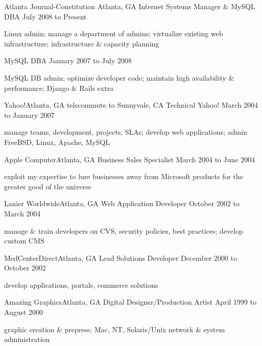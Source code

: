 \documentclass[10pt]{article}
\begin{document}


\sectionheader
{Atlanta Journal-Constitution}
{Atlanta, GA}
{Internet Systems Manager \& MySQL DBA}
{July 2008 to Present}
\begin{longtext}
Linux admin;
manage a department of admins;
virtualize existing web infrastructure;
infrastructure \& capacity planning
\end{longtext}
\sectionsub
{MySQL DBA}
{January 2007 to July 2008}
\begin{longtext}
MySQL DB admin;
optimize developer code;
maintain high availability \& performance;
Django \& Rails extra
\end{longtext}

\sectionheader
{Yahoo!}{Atlanta, GA telecommute to Sunnyvale, CA}
{Technical Yahoo!}
{March 2004 to January 2007}
\begin{longtext}
manage teams, development, projects, SLAs;
develop web applications;
admin FreeBSD, Linux, Apache, MySQL
\end{longtext}

\sectionheader
{Apple Computer}{Atlanta, GA}
{Business Sales Specialist}
{March 2004 to June 2004}
\begin{longtext}
exploit my expertise to lure businesses away from Microsoft products for the greater good of the universe
\end{longtext}

\sectionheader
{Lanier Worldwide}{Atlanta, GA}
{Web Application Developer}
{October 2002 to March 2004}
\begin{longtext}
manage \& train developers on CVS, security policies, best practices;
develop custom CMS
\end{longtext}

\sectionheader
{MedCenterDirect}{Atlanta, GA}
{Lead Solutions Developer}
{December 2000 to October 2002}
\begin{longtext}
develop applications, portals, commerce solutions
\end{longtext}

\sectionheader
{Amazing Graphics}{Atlanta, GA}
{Digital Designer/Production Artist}
{April 1999 to August 2000}
\begin{longtext}
graphic creation \& prepress;
Mac, NT, Solaris/Unix network \& system administration
\end{longtext}
\end{document}
